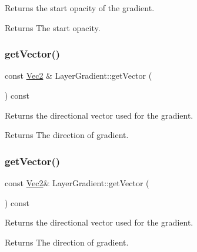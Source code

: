 Returns the start opacity of the gradient.

\begin{DoxyReturn}{Returns}
The start opacity. 
\end{DoxyReturn}
\mbox{\label{classLayerGradient_aaa3bb25c28ff4f48795cf419a0a9348a}} 
\subsubsection{\texorpdfstring{get\+Vector()}{getVector()}\hspace{0.1cm}{\footnotesize\ttfamily [1/2]}}
{\footnotesize\ttfamily const \hyperlink{classVec2}{Vec2} \& Layer\+Gradient\+::get\+Vector (\begin{DoxyParamCaption}{ }\end{DoxyParamCaption}) const}

Returns the directional vector used for the gradient.

\begin{DoxyReturn}{Returns}
The direction of gradient. 
\end{DoxyReturn}
\mbox{\label{classLayerGradient_ab49b8e9891ff51fcdc8c11d87f5ba763}} 
\subsubsection{\texorpdfstring{get\+Vector()}{getVector()}\hspace{0.1cm}{\footnotesize\ttfamily [2/2]}}
{\footnotesize\ttfamily const \hyperlink{classVec2}{Vec2}\& Layer\+Gradient\+::get\+Vector (\begin{DoxyParamCaption}{ }\end{DoxyParamCaption}) const}

Returns the directional vector used for the gradient.

\begin{DoxyReturn}{Returns}
The direction of gradient. 
\end{DoxyReturn}
\mbox{\label{classLayerGradient_a4525eb8334b09187ffcf99ece5b5b9e8}} 
